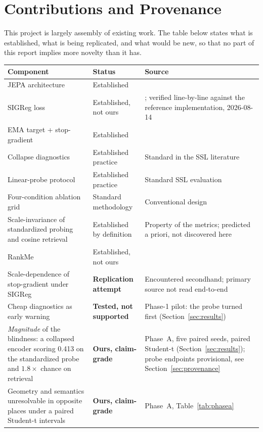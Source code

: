 \section{Contributions and Provenance}

This project is largely assembly of existing work. The table below states what is
established, what is being replicated, and what would be new, so that no part of this
report implies more novelty than it has.

\begin{table}[h]
\centering
\small
\begin{tabular}{p{5.2cm} p{2.6cm} p{6.2cm}}
\toprule
\textbf{Component} & \textbf{Status} & \textbf{Source} \\
\midrule
JEPA architecture & Established & \citet{assran2023ijepa} \\
SIGReg loss & Established, not ours & \citet{lejepa2025}; verified line-by-line against the reference implementation, 2026-08-14 \\
EMA target + stop-gradient & Established & \citet{grill2020byol,chen2021simsiam} \\
Collapse diagnostics & Established practice & Standard in the SSL literature \\
Linear-probe protocol & Established practice & Standard SSL evaluation \\
Four-condition ablation grid & Standard methodology & Conventional design \\
Scale-invariance of standardized probing and cosine retrieval & Established by definition & Property of the metrics; predicted a priori, not discovered here \\
RankMe & Established, not ours & \citet{garrido2023rankme} \\
Scale-dependence of stop-gradient under SIGReg & \textbf{Replication attempt} & Encountered secondhand; primary source not read end-to-end \\
Cheap diagnostics as early warning & \textbf{Tested, not supported} & Phase-1 pilot: the probe turned first (Section~\ref{sec:results}) \\
\emph{Magnitude} of the blindness: a collapsed encoder scoring 0.413 on the standardized probe and $1.8\times$ chance on retrieval & \textbf{Ours, claim-grade} & Phase~A, five paired seeds, paired Student-t (Section~\ref{sec:results}); probe endpoints provisional, see Section~\ref{sec:provenance} \\
Geometry and semantics unresolvable in opposite places under a paired Student-t intervals & \textbf{Ours, claim-grade} & Phase~A, Table~\ref{tab:phasea} \\

\end{tabular}
\end{table}

